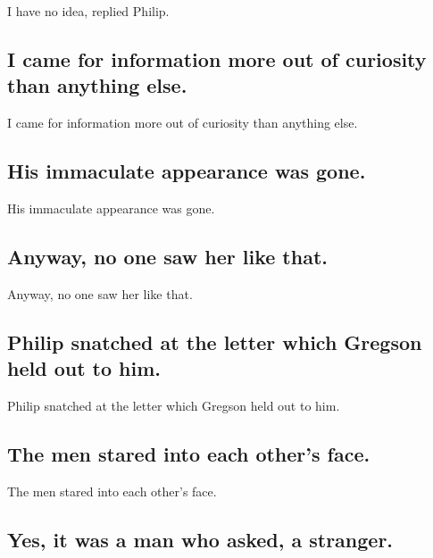 \documentclass[]{article}
\begin{document}
I have no idea, replied Philip.

\hypertarget{i-came-for-information-more-out-of-curiosity-than-anything-else.}{%
\subsection{I came for information more out of curiosity than anything
else.}\label{i-came-for-information-more-out-of-curiosity-than-anything-else.}}

I came for information more out of curiosity than anything else.

\hypertarget{his-immaculate-appearance-was-gone.}{%
\subsection{His immaculate appearance was
gone.}\label{his-immaculate-appearance-was-gone.}}

His immaculate appearance was gone.

\hypertarget{anyway-no-one-saw-her-like-that.}{%
\subsection{Anyway, no one saw her like
that.}\label{anyway-no-one-saw-her-like-that.}}

Anyway, no one saw her like that.

\hypertarget{philip-snatched-at-the-letter-which-gregson-held-out-to-him.}{%
\subsection{Philip snatched at the letter which Gregson held out to
him.}\label{philip-snatched-at-the-letter-which-gregson-held-out-to-him.}}

Philip snatched at the letter which Gregson held out to him.

\hypertarget{the-men-stared-into-each-others-face.}{%
\subsection{The men stared into each other's
face.}\label{the-men-stared-into-each-others-face.}}

The men stared into each other's face.

\hypertarget{yes-it-was-a-man-who-asked-a-stranger.}{%
\subsection{Yes, it was a man who asked, a
stranger.}\label{yes-it-was-a-man-who-asked-a-stranger.}}
\end{document}
